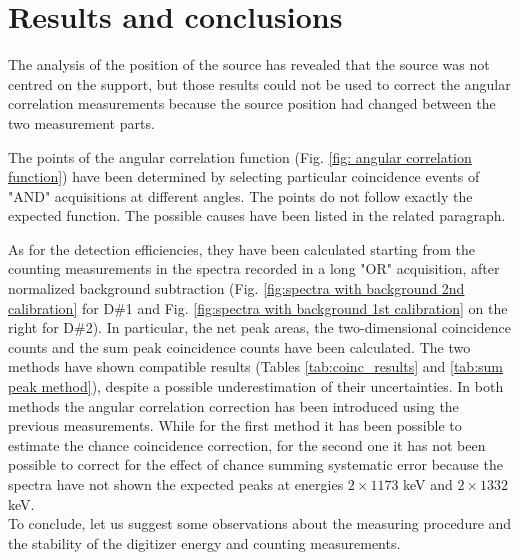 \documentclass[a4paper]{article}
\begin{document}
\section{Results and conclusions}
The analysis of the position of the source %
has revealed that the source was not centred on the support, but those results could not be used to correct the angular correlation measurements because the source position had changed between the two measurement parts. 

The points of the angular correlation function (Fig. \ref{fig: angular correlation function}) have been determined by selecting particular coincidence events of "AND" acquisitions at different angles. The points do not follow exactly the expected function. %
The possible causes have been listed in the related paragraph.

As for the detection efficiencies, they have been calculated starting from the counting measurements in the spectra recorded in a long "OR" acquisition, after normalized background subtraction (Fig. \ref{fig:spectra with background 2nd calibration} for D\#1 and Fig. \ref{fig:spectra with background 1st calibration} on the right for D\#2). In particular, the net peak areas, the two-dimensional coincidence counts and the sum peak coincidence counts have been calculated. The two methods have shown compatible results (Tables \ref{tab:coinc_results} and \ref{tab:sum peak method}), despite a possible underestimation of their uncertainties. %
In both methods the angular correlation correction has been introduced using the previous measurements. While for the first method it has been possible to estimate the chance coincidence correction, for the second one it has not been possible to correct for the effect of chance summing systematic error because the spectra have not shown the expected peaks at energies $2\times1173$ keV and $2\times1332$ keV.\\

\noindent
To conclude, let us suggest some observations about the measuring procedure and the stability of the digitizer energy and counting measurements. %
\end{document}
